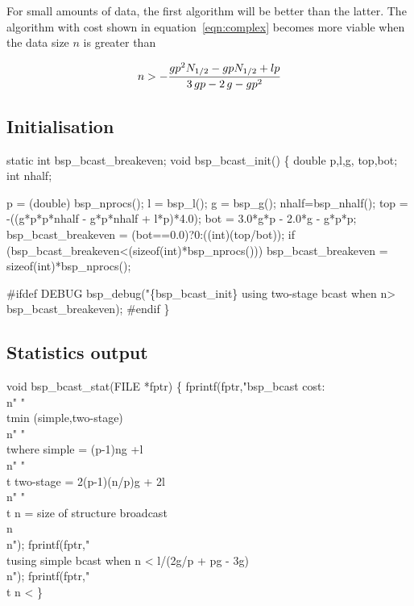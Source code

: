 For small amounts of data, the first algorithm will be better than the
latter. The algorithm with cost shown in equation~\ref{eqn:complex}
becomes more viable when the data size $n$ is greater than

\begin{equation}
n> -{\frac {gp^{2}{N_{1/2}}-gp{N_{1/2}}+lp}{3\,gp-2\,g-gp^{
2}}}
\end{equation}

\subsection{Initialisation}
\begin{code}
static int bsp_bcast_breakeven;
void bsp_bcast_init() \{
  double p,l,g, top,bot;
  int nhalf;


  p    = (double) bsp_nprocs();
  l    = bsp_l();
  g    = bsp_g(); 
  nhalf=bsp_nhalf();
  top = -((g*p*p*nhalf - g*p*nhalf + l*p)*4.0);
  bot = 3.0*g*p - 2.0*g - g*p*p;
  bsp_bcast_breakeven = (bot==0.0)?0:((int)(top/bot));
  if (bsp_bcast_breakeven<(sizeof(int)*bsp_nprocs()))
    bsp_bcast_breakeven = sizeof(int)*bsp_nprocs();
  
#ifdef DEBUG
  bsp_debug("\{bsp_bcast_init\} using two-stage bcast when n>%
            bsp_bcast_breakeven);
#endif
 \}
\end{code}

\subsection{Statistics output}
\begin{code}
void bsp_bcast_stat(FILE *fptr) \{
  fprintf(fptr,"bsp_bcast cost:\\n"
               "\\tmin (simple,two-stage)\\n"
               "\\twhere simple    = (p-1)ng +l\\n"
               "\\t      two-stage = 2(p-1)(n/p)g + 2l\\n"
               "\\t      n         = size of structure broadcast\\n\\n");
  fprintf(fptr,"\\tusing simple bcast when n < l/(2g/p + pg - 3g)\\n");
  fprintf(fptr,"\\t                        n < %
 \}
\end{code}


